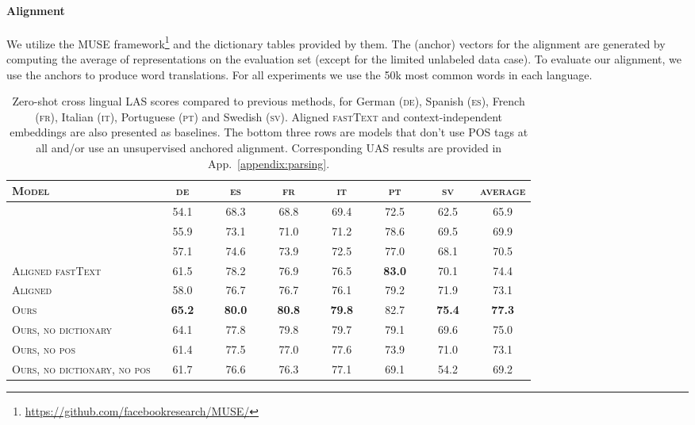 \documentclass[11pt,a4paper]{article}
\newcommand{\appref}[1]{App.~\ref{#1}}
\begin{document}
\paragraph{Alignment}
We utilize the MUSE framework\footnote{\url{https://github.com/facebookresearch/MUSE/}} \cite{conneau2017word} and the dictionary tables provided by them. 
The  (anchor) vectors for the alignment are generated by computing the average of representations on the evaluation set (except for the limited unlabeled data case). To evaluate our alignment, we use the anchors to produce word translations. For all experiments we use the 50k most common words in each language.


\begin{table*}[t!]
\begin{tabular}{l|cccccc|c}
\toprule
\textsc{Model}              & \textsc{de}        & \textsc{es}        & \textsc{fr}        & \textsc{it}        & \textsc{pt}        & \textsc{sv}        & \textsc{average}       \\ \midrule
\citet{zhang_hierarchical_2015}           & 54.1     & \ \ 68.3\ \      & 68.8     & 69.4     & 72.5     & 62.5     & 65.9     \\ \citet{guo_representation_2016}                & 55.9     & 73.1     & 71.0     & 71.2     & 78.6     & 69.5     & 69.9     \\ \citet{ammar_one_2016}           & \ \ 57.1\ \  & \ \ 74.6\ \  & \ \ 73.9\ \  & \ \ 72.5\ \  & \ \ 77.0\ \ & \ \ 68.1\ \  & 70.5 \\ \midrule 
\textsc{Aligned fastText} & 61.5 & 78.2  & 76.9 & 76.5 & \textbf{83.0} & 70.1 & 74.4 \\ \textsc{Aligned}        & 58.0 & 76.7 & 76.7 & 76.1 & 79.2 & 71.9 & 73.1 \\ \textsc{Ours}               & \textbf{65.2} & \textbf{80.0} & \textbf{80.8} & \textbf{79.8} & 82.7 & \textbf{75.4} & \textbf{77.3} \\ \midrule \midrule
\textsc{Ours, no dictionary} &    64.1 & 77.8 & 79.8 & 79.7 & 79.1 & 69.6 & 75.0 \\ 
\textsc{Ours, no pos}     & 61.4 & 77.5  & 77.0 & 77.6 & 73.9 &   71.0 & 73.1  \\ 
\textsc{Ours, no dictionary, no pos} & 61.7  &	76.6  &	76.3  &	77.1  &	69.1  &	54.2 & 69.2\\ 


\bottomrule
\end{tabular}
\caption{Zero-shot cross lingual LAS scores compared to previous methods, for German (\textsc{de}), Spanish (\textsc{es}), French (\textsc{fr}), Italian (\textsc{it}), Portuguese (\textsc{pt}) and Swedish (\textsc{sv}). Aligned \textsc{fastText} and  context-independent embeddings are also presented as baselines. The bottom three rows are models that don't use POS tags at all and/or use an unsupervised anchored alignment. Corresponding UAS results are provided in \appref{appendix:parsing}.}\label{table:zeroshot}
\end{table*} 
\end{document}
